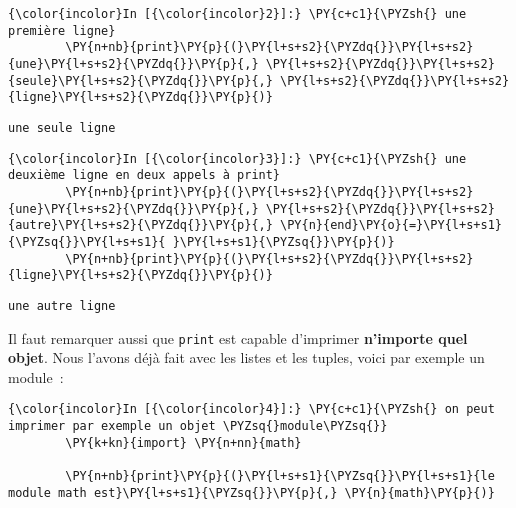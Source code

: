     \begin{Verbatim}[commandchars=\\\{\},frame=single,framerule=0.3mm,rulecolor=\color{cellframecolor}]
{\color{incolor}In [{\color{incolor}2}]:} \PY{c+c1}{\PYZsh{} une première ligne}
        \PY{n+nb}{print}\PY{p}{(}\PY{l+s+s2}{\PYZdq{}}\PY{l+s+s2}{une}\PY{l+s+s2}{\PYZdq{}}\PY{p}{,} \PY{l+s+s2}{\PYZdq{}}\PY{l+s+s2}{seule}\PY{l+s+s2}{\PYZdq{}}\PY{p}{,} \PY{l+s+s2}{\PYZdq{}}\PY{l+s+s2}{ligne}\PY{l+s+s2}{\PYZdq{}}\PY{p}{)}
\end{Verbatim}


    \begin{Verbatim}[commandchars=\\\{\},frame=single,framerule=0.3mm,rulecolor=\color{cellframecolor}]
une seule ligne
\end{Verbatim}

    \begin{Verbatim}[commandchars=\\\{\},frame=single,framerule=0.3mm,rulecolor=\color{cellframecolor}]
{\color{incolor}In [{\color{incolor}3}]:} \PY{c+c1}{\PYZsh{} une deuxième ligne en deux appels à print}
        \PY{n+nb}{print}\PY{p}{(}\PY{l+s+s2}{\PYZdq{}}\PY{l+s+s2}{une}\PY{l+s+s2}{\PYZdq{}}\PY{p}{,} \PY{l+s+s2}{\PYZdq{}}\PY{l+s+s2}{autre}\PY{l+s+s2}{\PYZdq{}}\PY{p}{,} \PY{n}{end}\PY{o}{=}\PY{l+s+s1}{\PYZsq{}}\PY{l+s+s1}{ }\PY{l+s+s1}{\PYZsq{}}\PY{p}{)}
        \PY{n+nb}{print}\PY{p}{(}\PY{l+s+s2}{\PYZdq{}}\PY{l+s+s2}{ligne}\PY{l+s+s2}{\PYZdq{}}\PY{p}{)}
\end{Verbatim}


    \begin{Verbatim}[commandchars=\\\{\},frame=single,framerule=0.3mm,rulecolor=\color{cellframecolor}]
une autre ligne
\end{Verbatim}

    Il faut remarquer aussi que \texttt{print} est capable d'imprimer
\textbf{n'importe quel objet}. Nous l'avons déjà fait avec les listes et
les tuples, voici par exemple un module~:

    \begin{Verbatim}[commandchars=\\\{\},frame=single,framerule=0.3mm,rulecolor=\color{cellframecolor}]
{\color{incolor}In [{\color{incolor}4}]:} \PY{c+c1}{\PYZsh{} on peut imprimer par exemple un objet \PYZsq{}module\PYZsq{}}
        \PY{k+kn}{import} \PY{n+nn}{math}
        
        \PY{n+nb}{print}\PY{p}{(}\PY{l+s+s1}{\PYZsq{}}\PY{l+s+s1}{le module math est}\PY{l+s+s1}{\PYZsq{}}\PY{p}{,} \PY{n}{math}\PY{p}{)}
\end{Verbatim}


